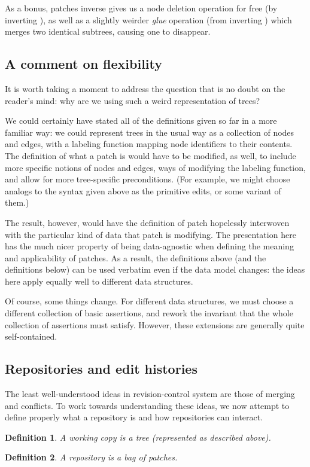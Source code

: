 \documentclass{article}
\newtheorem{definition}{Definition}
\begin{document}
As a bonus, patches inverse gives us a node deletion operation for free (by
inverting \einsert), as well as a slightly weirder \emph{glue} operation
(from inverting \ecopy) which merges two identical subtrees, causing one to
disappear.

\subsection{A comment on flexibility}
\label{sec:flexibility}
It is worth taking a moment to address the question that is no doubt on the
reader's mind: why are we using such a weird representation of trees?

We could certainly have stated all of the definitions given so far in a more
familiar way: we could represent trees in the usual way as a collection of
nodes and edges, with a labeling function mapping node identifiers to their
contents.  The definition of what a patch is would have to be modified, as
well, to include more specific notions of nodes and edges, ways of modifying
the labeling function, and allow for more tree-specific preconditions. (For
example, we might choose analogs to the syntax given above as the primitive
edits, or some variant of them.)

The result, however, would have the definition of patch hopelessly
interwoven with the particular kind of data that patch is modifying. The
presentation here has the much nicer property of being data-agnostic when
defining the meaning and applicability of patches. As a result, the
definitions above (and the definitions below) can be used verbatim even if
the data model changes: the ideas here apply equally well to different data
structures.

Of course, some things change. For different data structures, we must choose
a different collection of basic assertions, and rework the invariant that
the whole collection of assertions must satisfy. However, these extensions
are generally quite self-contained.

\subsection{Repositories and edit histories}
The least well-understood ideas in revision-control system are those of
merging and conflicts. To work towards understanding these ideas, we now
attempt to define properly what a repository is and how repositories can
interact.

\begin{definition}
    A \emph{working copy} is a tree (represented as described above).
\end{definition}
\begin{definition}
    A \emph{repository} is a bag of patches.
\end{definition}
\end{document}
